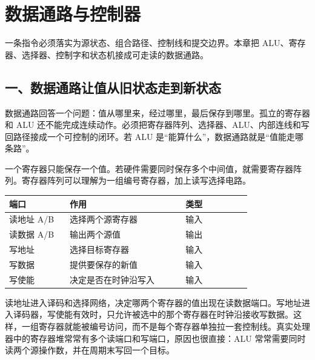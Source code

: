 \chapter{数据通路与控制器}

\begin{keyidea}
一条指令必须落实为源状态、组合路径、控制线和提交边界。本章把 ALU、寄存器、选择器、控制字和状态机接成可走读的数据通路。
\end{keyidea}

\section{一、数据通路让值从旧状态走到新状态}

数据通路回答一个问题：值从哪里来，经过哪里，最后保存到哪里。孤立的寄存器和 ALU 还不能完成连续动作。必须把寄存器阵列、选择器、ALU、内部连线和写回路径接成一个可控制的闭环。若 ALU 是“能算什么”，数据通路就是“值能走哪条路”。

一个寄存器只能保存一个值。若硬件需要同时保存多个中间值，就需要寄存器阵列。寄存器阵列可以理解为一组编号寄存器，加上读写选择电路。

\begin{longtable}{L{0.22\linewidth}L{0.42\linewidth}L{0.24\linewidth}}
\toprule
端口 & 作用 & 类型 \\
\midrule
读地址 A/B & 选择两个源寄存器 & 输入 \\\tablerowrule
读数据 A/B & 输出两个源值 & 输出 \\\tablerowrule
写地址 & 选择目标寄存器 & 输入 \\\tablerowrule
写数据 & 提供要保存的新值 & 输入 \\\tablerowrule
写使能 & 决定是否在时钟沿写入 & 输入 \\
\bottomrule
\end{longtable}

读地址进入译码和选择网络，决定哪两个寄存器的值出现在读数据端口。写地址进入译码器，写使能有效时，只允许被选中的那个寄存器在时钟沿接收写数据。这样，一组寄存器就能被编号访问，而不是每个寄存器单独拉一套控制线。真实处理器中的寄存器堆常常有多个读端口和写端口，原因也很直接：ALU 常常需要同时读两个源操作数，并在周期末写回一个目标。

